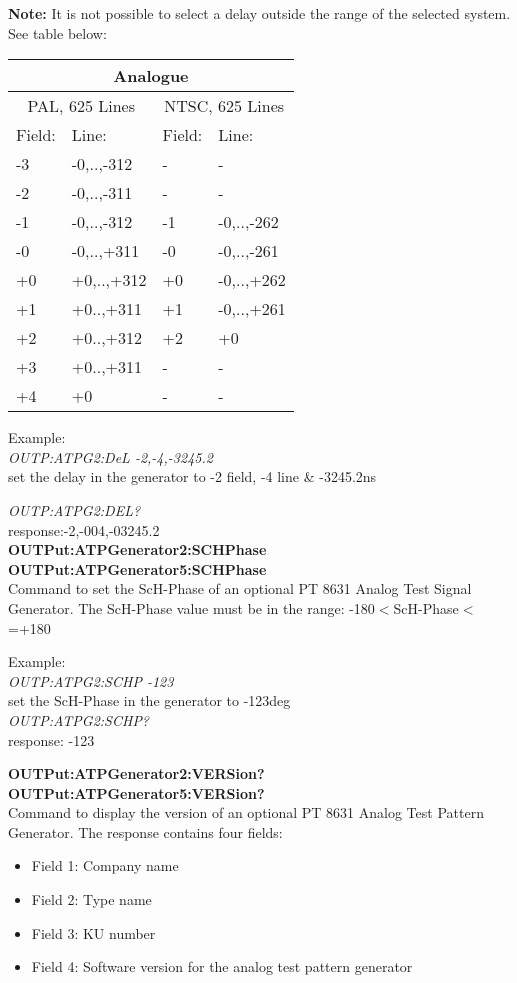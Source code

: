 \textbf{Note:} It is not possible to select a delay outside the range of the selected system. See table below:

\begin{tabular}{|p{4em}|p{4em}|p{4em}|p{4em}|}
\hline
\multicolumn{4}{|c|}{Analogue} \\ 
\hline
\multicolumn{2}{|c|}{PAL, 625 Lines} & \multicolumn{2}{|c|}{NTSC, 625 Lines} \\ 
\hline
Field: 	& Line: 			& Field: 				& Line: 			\\ \hline
-3 			& -0,..,-312	& -							& -						\\ \hline
-2			& -0,..,-311	& -							& -						\\ \hline
-1			& -0,..,-312	& -1 						& -0,..,-262	\\ \hline
-0			& -0,..,+311	& -0 						& -0,..,-261	\\ \hline
+0			& +0,..,+312	& +0						& -0,..,+262	\\ \hline
+1			& +0..,+311		& +1						& -0,..,+261	\\ \hline
+2			& +0..,+312		& +2						& +0					\\ \hline
+3			& +0..,+311		& -							& -						\\ \hline
+4			& +0					& -							& -						\\ \hline
\end{tabular}

Example:\\
\textit{OUTP:ATPG2:DeL -2,-4,-3245.2}\\
set the delay in the generator to -2 field, -4 line \& -3245.2ns

\textit{OUTP:ATPG2:DEL?}\\
response:-2,-004,-03245.2\\

\textbf{OUTPut:ATPGenerator2:SCHPhase}\\
\textbf{OUTPut:ATPGenerator5:SCHPhase}\\
Command to set the ScH-Phase of an optional PT 8631 Analog Test Signal Generator. The ScH-Phase value must be in the range: -180$<$ScH-Phase$<$=+180

Example:\\
\textit{OUTP:ATPG2:SCHP -123}\\
set the ScH-Phase in the generator to -123deg\\
\textit{OUTP:ATPG2:SCHP?}\\
response: -123

\textbf{OUTPut:ATPGenerator2:VERSion?}\\
\textbf{OUTPut:ATPGenerator5:VERSion?}\\
Command to display the version of an optional PT 8631 Analog Test Pattern Generator. The response contains four fields:
\begin{itemize}
\item Field 1: Company name
\item Field 2: Type name
\item Field 3: KU number
\item Field 4: Software version for the analog test pattern generator
\end{itemize}

